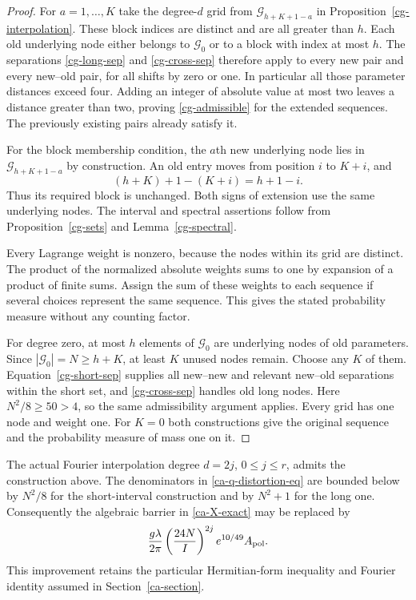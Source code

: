 \begin{proof}
For $a=1,\ldots,K$ take the degree-$d$ grid from
$\mathcal G_{h+K+1-a}$ in
Proposition~\ref{cg-interpolation}.
These block indices are distinct and are all greater
than $h$.  Each old underlying node either belongs to
$\mathcal G_0$ or to a block with index at most $h$.
The separations \eqref{cg-long-sep} and
\eqref{cg-cross-sep} therefore apply to every new pair
and every new--old pair, for all shifts by zero or one.
In particular all those parameter distances exceed four.
Adding an integer of absolute value at most two leaves
a distance greater than two, proving
\eqref{cg-admissible} for the extended sequences.
The previously existing pairs already satisfy it.

For the block membership condition, the $a$th new
underlying node lies in
$\mathcal G_{h+K+1-a}$ by construction.
An old entry moves from position $i$ to $K+i$, and
\[
                  (h+K)+1-(K+i)=h+1-i.
\]
Thus its required block is unchanged.  Both signs
of extension use the same underlying nodes.  The
interval and spectral assertions follow from
Proposition~\ref{cg-sets} and Lemma~\ref{cg-spectral}.

Every Lagrange weight is nonzero, because the nodes
within its grid are distinct.  The product of the
normalized absolute weights sums to one by expansion
of a product of finite sums.  Assign the sum of these
weights to each sequence if several choices represent
the same sequence.  This gives the stated probability
measure without any counting factor.

For degree zero, at most $h$ elements of $\mathcal G_0$
are underlying nodes of old parameters.  Since
$|\mathcal G_0|=N\geq h+K$, at least $K$ unused
nodes remain.  Choose any $K$ of them.
Equation~\eqref{cg-short-sep} supplies all new--new
and relevant new--old separations within the short
set, and \eqref{cg-cross-sep} handles old long nodes.
Here $N^2/8\geq50>4$, so the same admissibility
argument applies.  Every grid has one node and weight
one.  For $K=0$ both constructions give the original
sequence and the probability measure of mass one on it.
\end{proof}

\begin{corollary}\label{cg-actual-constant}
The actual Fourier interpolation degree $d=2j$,
$0\leq j\leq r$, admits the construction above.
The denominators in \eqref{ca-q-distortion-eq} are
bounded below by $N^2/8$ for the short-interval
construction and by $N^2+1$ for the long one.
Consequently the algebraic barrier in
\eqref{ca-X-exact} may be replaced by
\[
 \frac{g\lambda}{2\pi}
        \left(\frac{24N}{I}\right)^{2j}
                             e^{10/49}A_{\rm pol}.
\]
This improvement retains the particular Hermitian-form
inequality and Fourier identity assumed in
Section~\ref{ca-section}.
\end{corollary}

